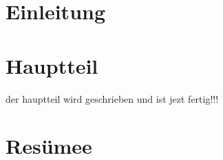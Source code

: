 \documentclass[11pt,a4paper]{article}
\begin{document}
\section{Einleitung}

\section{Hauptteil}

der hauptteil wird geschrieben und ist jezt fertig!!!

\section{Resümee}
\end{document}
